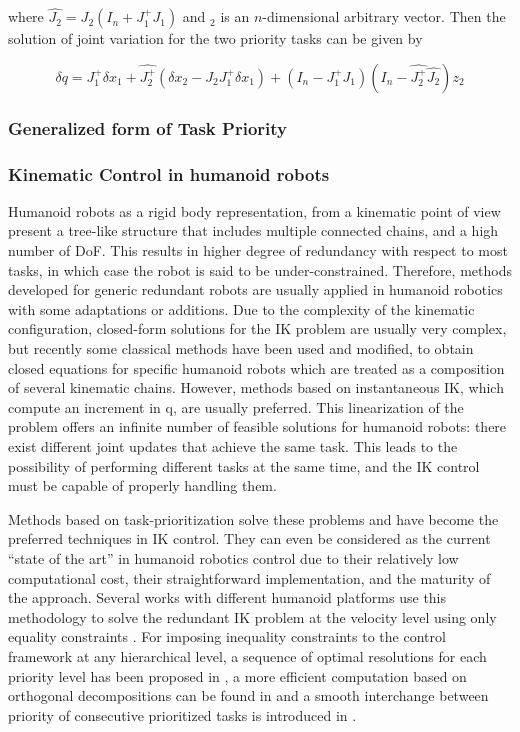 where $\hat{J_2} = J_2(I_n + J_1^+J_1)$ and $_2$ is an $n$-dimensional arbitrary vector. Then the solution of joint variation for the two priority tasks can be given by 

\begin{equation}
    \delta q = J^+_1 \delta x_1 + \hat{J_2^+}(\delta x_2 - J_2J_1^+ \delta x_1) + (I_n - J^+_1J_1)(I_n - \hat{J_2^+}\hat{J_2})z_2
\end{equation}

\subsubsection{Generalized form of Task Priority}



\subsubsection{Kinematic Control in humanoid robots}

Humanoid robots as a rigid body representation, from a kinematic point of view present a tree-like structure that includes multiple connected chains, and a high number of DoF. This results in 
higher degree of redundancy with respect to most tasks, in which case the robot is said to be under-constrained. Therefore, methods developed for generic redundant robots are usually applied in humanoid robotics
with some adaptations or additions. Due to the complexity of the kinematic configuration, closed-form solutions for the IK problem are usually very complex, but recently some classical methods 
have been used and modified, to obtain closed equations for specific humanoid robots which are treated as a composition of several kinematic chains. However, methods based on 
instantaneous IK, which compute an increment in q, are usually preferred. This linearization of the problem offers an infinite number of feasible solutions for humanoid robots: there exist different
joint updates that achieve the same task. This leads to the possibility of performing different tasks at the same time, and the IK control must be capable of properly handling them.

 

Methods based on task-prioritization solve these problems and have become the preferred techniques in IK control. They can even be considered as the current “state of the art” in humanoid 
robotics control due to their relatively low computational cost, their straightforward implementation, and the maturity of the approach. Several works with different humanoid platforms use this 
methodology to solve the redundant IK problem at the velocity level using only equality constraints \cite{gienger2005task,yoshida2006task,mansard2007task}. For imposing inequality constraints 
to the control framework at any hierarchical level, a sequence of optimal resolutions for each priority level has been proposed in \cite{kanoun2009prioritizing}, a more efficient computation based on orthogonal 
decompositions can be found in \cite{escande2013planning} and a smooth interchange between priority of consecutive prioritized tasks is introduced in \cite{jarquin2013real}.

